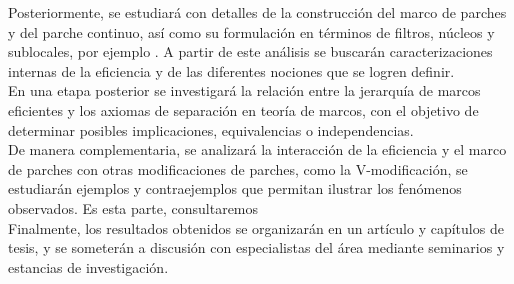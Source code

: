 \documentclass{protocol_template}
\begin{document}
Posteriormente, se estudiará con detalles de la construcción del marco de parches y del parche continuo, así como su formulación en términos de filtros, núcleos y sublocales, por ejemplo \cite{escardo2006compactly, escardo2001regular, sexton2006point, sexton2006ordinal, gierz2012compendium}. 
A partir de este análisis se buscarán caracterizaciones internas de la eficiencia y de las diferentes nociones que se logren definir.\\

En una etapa posterior se investigará la relación entre la jerarquía de marcos eficientes y los axiomas de separación en teoría de marcos, con el objetivo de determinar 
posibles implicaciones, equivalencias o independencias.\\

De manera complementaria, se analizará la interacción de la eficiencia y el marco de parches con otras modificaciones de parches, como la V-modificación,  se estudiarán ejemplos y contraejemplos que permitan ilustrar los fenómenos observados.
Es esta parte, consultaremos \cite{klinke2013yet, simmons2004vietoris, johnstone2020vietoris, simmons2006fundamental, avila2020frame, simmons2006regularity}\\

Finalmente, los resultados obtenidos se organizarán en un artículo y capítulos de tesis, y se someterán a discusión con especialistas del área mediante seminarios y estancias de investigación.\\
\end{document}
